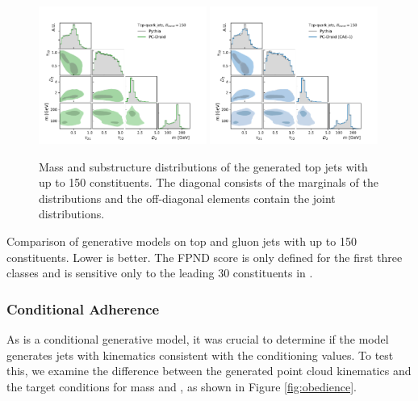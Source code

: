 \begin{figure}[tb]
    \centering
    \includegraphics[width=0.49\textwidth]{Figures/jet_generation/droid/150/hlvs/t/100/hlv_corr_PC-Droid.pdf}
    \includegraphics[width=0.49\textwidth]{Figures/jet_generation/droid/150/hlvs/t/100/hlv_corr_PC-DroidCAE1.pdf}
    \caption{
        Mass and substructure distributions of the generated top jets with up to 150 constituents.
        The diagonal consists of the marginals of the distributions and the off-diagonal elements contain the joint distributions.
    }
    \label{fig:hlvs-150}
\end{figure}

\begin{table}[tb]
    \centering
    \renewcommand{\arraystretch}{1.5}
    \caption{Comparison of generative models on top and gluon jets with up to 150 constituents. Lower is better. The FPND score is only defined for the first three classes and is sensitive only to the leading 30 constituents in \pt.}
    \label{tab:perf-150}
    \resizebox{\textwidth}{!}{%
        
    }
\end{table}

\FloatBarrier

\subsubsection{Conditional Adherence}

As \pcdroid is a conditional generative model, it was crucial to determine if the model generates jets with kinematics consistent with the conditioning values.
To test this, we examine the difference between the generated point cloud kinematics and the target conditions for mass and \pt, as shown in Figure \ref{fig:obedience}.

